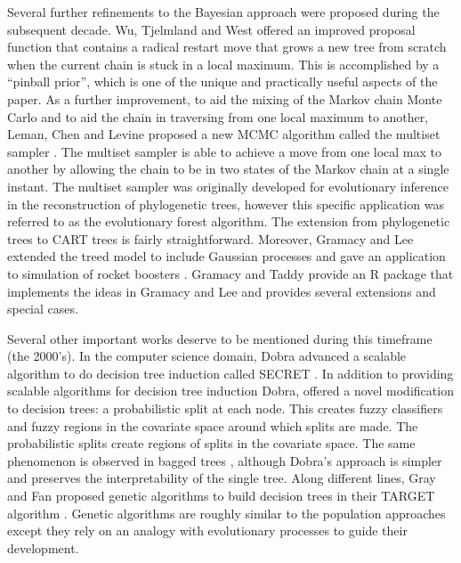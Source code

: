 Several further refinements to the Bayesian approach were proposed during the subsequent decade. Wu, Tjelmland and West \cite{wu2007bayesian} offered an improved proposal function that contains a radical restart move that grows a new tree from scratch when the current chain is stuck in a local maximum. This is accomplished by a ``pinball prior'', which is one of the unique and practically useful aspects of the paper. As a further improvement, to aid the mixing of the Markov chain Monte Carlo and to aid the chain in traversing from one local maximum to another, Leman, Chen and Levine proposed a new MCMC algorithm called the multiset sampler \cite{leman2009multiset}. The multiset sampler is able to achieve a move from one local max to another by allowing the chain to be in two states of the Markov chain at a single instant. The multiset sampler was originally developed for evolutionary inference in the reconstruction of phylogenetic trees, however this specific application was referred to as the evolutionary forest algorithm. The extension from phylogenetic trees to CART trees is fairly straightforward.  Moreover, Gramacy and Lee extended the treed model to include Gaussian processes and gave an application to simulation of rocket boosters \cite{gramacy2008bayesian}. Gramacy and Taddy \cite{gramacy2012categorical} provide an R package that implements the ideas in Gramacy and Lee \cite{gramacy2008bayesian} and provides several extensions and special cases. 

Several other important works deserve to be mentioned during this timeframe (the 2000's).  In the computer science domain, Dobra advanced a scalable algorithm to do decision tree induction called SECRET \cite{dobra2002secret}. In addition to providing scalable algorithms for decision tree induction Dobra, offered a novel modification to decision trees: a probabilistic split at each node. This creates fuzzy classifiers and fuzzy regions in the covariate space around which splits are made. The probabilistic splits create regions of splits in the covariate space. The same phenomenon is observed in bagged trees \cite{breiman1996bagging}, although Dobra's approach is simpler and preserves the interpretability of the single tree. Along different lines, Gray and Fan proposed genetic algorithms to build decision trees in their TARGET algorithm \cite{gray2008classification}. Genetic algorithms are roughly similar to the population approaches \cite{cappe2004population} except they rely on an analogy with evolutionary processes to guide their development.  

